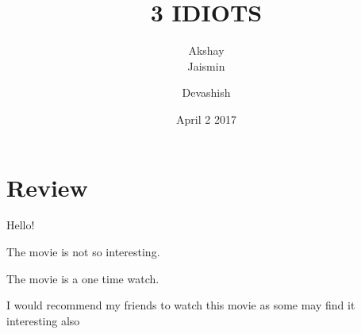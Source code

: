 \documentclass{article}
\title{3 IDIOTS}
\author{Akshay\\Jaismin}
\author{Devashish}
\date{April 2 2017}
\begin{document}
\maketitle
\section{Review}




Hello!

The movie is not so interesting.


The movie is a one time watch.

I would recommend my friends to watch this movie as some may find it interesting also 
\end{document}
